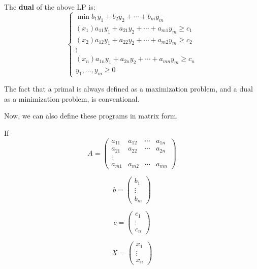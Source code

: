     The \textbf{dual} of the above LP is:
    \begin{equation}
        \begin{cases}
            \min b_1 y_1 + b_2 y_2 + \cdots + b_m y_m\\
            (x_1) a_{11} y_1 + a_{21} y_2 + \cdots + a_{m1} y_m \geq c_1\\
            (x_2) a_{12} y_1 + a_{22} y_2 + \cdots + a_{m2} y_m \geq c_2\\
            \vdots\\
            (x_n) a_{1n} y_1 + a_{2n} y_2 + \cdots + a_{mn} y_m \geq c_n\\
            y_1, \dots, y_m \geq 0
        \end{cases}
    \end{equation}

    The fact that a primal is always defined as a maximization problem, and a dual as a minimization problem, is conventional.

    Now, we can also define these programs in matrix form.

    If
    \begin{equation}
        A = 
        \begin{pmatrix}
            a_{11} & a_{12} & \cdots & a_{1n}\\
            a_{21} & a_{22} & \cdots & a_{2n}\\
            \vdots\\
            a_{m1} & a_{m2} & \cdots & a_{mn}
        \end{pmatrix}
    \end{equation}

    \begin{equation}
        b = 
        \begin{pmatrix}
            b_1\\
            \vdots\\
            b_m
        \end{pmatrix}
    \end{equation}
    
    \begin{equation}
        c = 
        \begin{pmatrix}
            c_1\\
            \vdots\\
            c_n
        \end{pmatrix}
    \end{equation}

    \begin{equation}
        X = 
        \begin{pmatrix}
            x_1\\
            \vdots\\
            x_n
        \end{pmatrix}
    \end{equation}

